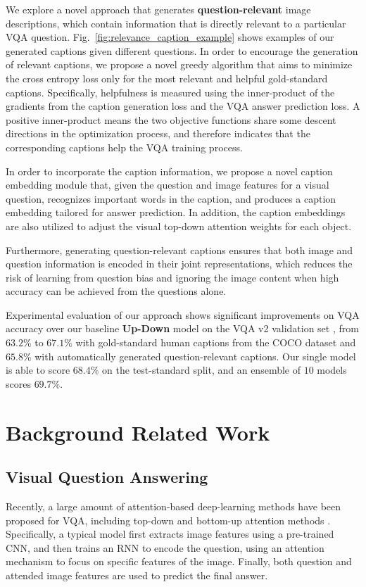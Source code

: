 \documentclass[11pt,a4paper]{article}
\begin{document}
We explore a novel approach that generates \textbf{question-relevant} image descriptions, which contain information that is directly relevant to a particular VQA question. Fig.\ \ref{fig:relevance_caption_example} shows examples of our generated captions given different questions. In order to encourage the generation of relevant captions, we propose a novel greedy algorithm that aims to minimize the cross entropy loss only for the most relevant and helpful gold-standard captions. Specifically, helpfulness is measured using the inner-product of the gradients from the caption generation loss and the VQA answer prediction loss. A positive inner-product means the two objective functions share some descent directions in the optimization process, and therefore indicates that the corresponding captions help the VQA training process.  

In order to incorporate the caption information, we propose a novel caption embedding module that, given the question and image features for a visual question, recognizes important words in the caption, and produces a caption embedding tailored for answer prediction. In addition, the caption embeddings are also utilized to adjust the visual top-down attention weights for each object.

Furthermore, generating question-relevant captions ensures that both image and question information is encoded in their joint representations, which reduces the risk of learning from question bias \cite{li2018tell} and ignoring the image content when high accuracy can be achieved from the questions alone.
 
Experimental evaluation of our approach shows significant improvements on VQA accuracy over our baseline \textbf{Up-Down} \cite{anderson2017bottom} model on the VQA v2 validation set \cite{antol2015vqa}, from $63.2\%$ to $67.1\%$ with gold-standard human captions from the COCO dataset \cite{chen2015microsoft}  and $65.8\%$ with automatically generated question-relevant captions. Our single model is able to score $68.4\%$ on the test-standard split, and an ensemble of $10$ models scores $69.7\%$.

\section{Background Related Work}
\subsection{Visual Question Answering} 
Recently, a large amount of attention-based deep-learning methods have been proposed for VQA, including top-down \cite{ren2015exploring,fukui2016multimodal,wu2016action,goyal2017making,li2018tell} and bottom-up attention methods \cite{anderson2017bottom,li2018vqa,wu2018self}. Specifically, a typical model first extracts image features using a pre-trained CNN, and then trains an RNN to encode the question, using an attention mechanism to focus on specific features of the image. Finally, both question and attended image features are used to predict the final answer.
\end{document}

